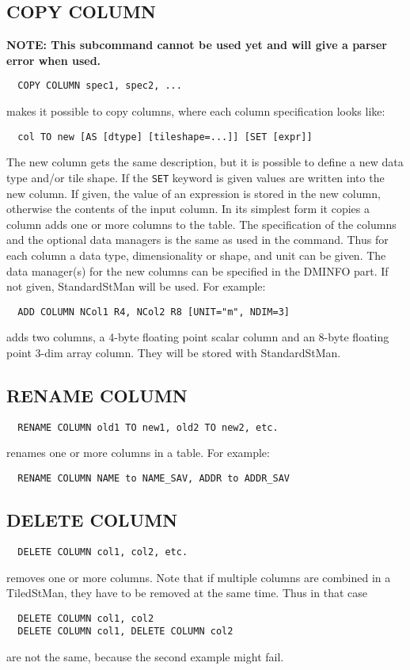 \subsection{COPY COLUMN}
\bf{NOTE:} This subcommand cannot be used yet and will give a parser
error when used.
\begin{verbatim}
  COPY COLUMN spec1, spec2, ...
\end{verbatim}
makes it possible to copy columns, where each column specification
looks like:
\begin{verbatim}
  col TO new [AS [dtype] [tileshape=...]] [SET [expr]]
\end{verbatim}
The new column gets the same description, but it is possible to define
a new data type and/or tile shape. If the \texttt{SET} keyword is
given values are written into the new column. If given, the value of an expression is
stored in the new column, otherwise the contents of the input column.
In its simplest form it copies a column
adds one or more columns to the table.
The specification of the columns and the optional data managers is the
same as used in the
 command. Thus for each column
a data type, dimensionality or shape, and unit  can be given.
The data manager(s) for the new columns can be specified in the DMINFO
part. If not given, StandardStMan will be used.
For example:
\begin{verbatim}
  ADD COLUMN NCol1 R4, NCol2 R8 [UNIT="m", NDIM=3]
\end{verbatim}
adds two columns, a 4-byte floating point scalar column and an 8-byte
floating point 3-dim array column. They will be stored with StandardStMan.

\subsection{RENAME COLUMN}
\begin{verbatim}
  RENAME COLUMN old1 TO new1, old2 TO new2, etc.
\end{verbatim}
renames one or more columns in a table.
For example:
\begin{verbatim}
  RENAME COLUMN NAME to NAME_SAV, ADDR to ADDR_SAV
\end{verbatim}

\subsection{DELETE COLUMN}
\begin{verbatim}
  DELETE COLUMN col1, col2, etc.
\end{verbatim}
removes one or more columns.
Note that if multiple columns are combined in a TiledStMan, they have
to be removed at the same time. Thus in that case
\begin{verbatim}
  DELETE COLUMN col1, col2
  DELETE COLUMN col1, DELETE COLUMN col2
\end{verbatim}
are not the same, because the second example might fail.


